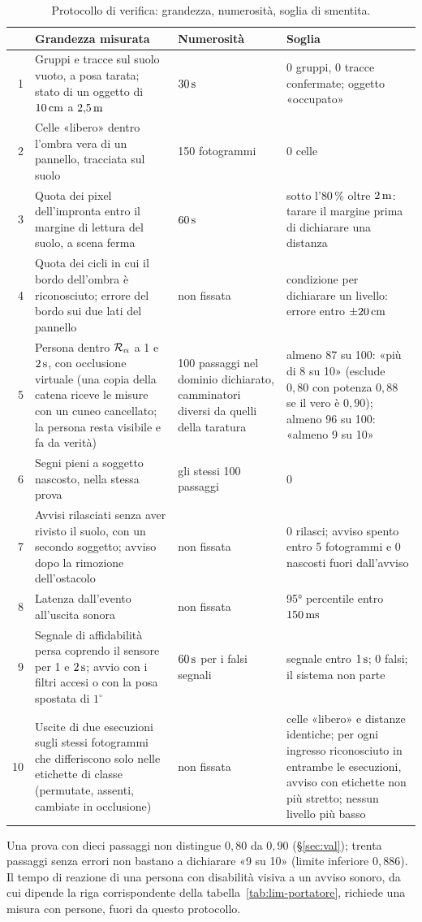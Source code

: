 \begin{table}[H]\centering\footnotesize
\caption{Protocollo di verifica: grandezza, numerosità, soglia di smentita.}\label{tab:lim-misure}
\begin{tabularx}{\linewidth}{@{}rLp{4.0cm}p{4.6cm}@{}}
\toprule
 & Grandezza misurata & Numerosità & Soglia\\
 & Gruppi e tracce sul suolo vuoto, a posa tarata; stato di un oggetto di $10\,\mathrm{cm}$ a $2{,}5\,\mathrm{m}$ & $30\,\mathrm{s}$ & 0 gruppi, 0 tracce confermate; oggetto «occupato»\\
2 & Celle «libero» dentro l'ombra vera di un pannello, tracciata sul suolo & 150 fotogrammi & 0 celle\\
3 & Quota dei pixel dell'impronta entro il margine di lettura del suolo, a scena ferma & $60\,\mathrm{s}$ & sotto l'$80\,\%$ oltre $2\,\mathrm{m}$: tarare il margine prima di dichiarare una distanza\\
4 & Quota dei cicli in cui il bordo dell'ombra è riconosciuto; errore del bordo sui due lati del pannello & non fissata & condizione per dichiarare un livello: errore entro $\pm20\,\mathrm{cm}$\\
5 & Persona dentro $\mathcal{R}_\alpha$ a 1 e $2\,\mathrm{s}$, con occlusione virtuale (una copia della catena riceve le misure con un cuneo cancellato; la persona resta visibile e fa da verità) & 100 passaggi nel dominio dichiarato, camminatori diversi da quelli della taratura & almeno 87 su 100: «più di 8 su 10» (esclude $0{,}80$ con potenza $0{,}88$ se il vero è $0{,}90$); almeno 96 su 100: «almeno 9 su 10»\\
6 & Segni pieni a soggetto nascosto, nella stessa prova & gli stessi 100 passaggi & 0\\
7 & Avvisi rilasciati senza aver rivisto il suolo, con un secondo soggetto; avviso dopo la rimozione dell'ostacolo & non fissata & 0 rilasci; avviso spento entro 5 fotogrammi e 0 nascosti fuori dall'avviso\\
8 & Latenza dall'evento all'uscita sonora & non fissata & 95° percentile entro $150\,\mathrm{ms}$\\
9 & Segnale di affidabilità persa coprendo il sensore per 1 e $2\,\mathrm{s}$; avvio con i filtri accesi o con la posa spostata di $1^\circ$ & $60\,\mathrm{s}$ per i falsi segnali & segnale entro $1\,\mathrm{s}$; 0 falsi; il sistema non parte\\
10 & Uscite di due esecuzioni sugli stessi fotogrammi che differiscono solo nelle etichette di classe (permutate, assenti, cambiate in occlusione) & non fissata & celle «libero» e distanze identiche; per ogni ingresso riconosciuto in entrambe le esecuzioni, avviso con etichette non più stretto; nessun livello più basso\\
\bottomrule
\end{tabularx}
\end{table}

Una prova con dieci passaggi non distingue $0{,}80$ da $0{,}90$ (\S\ref{sec:val}); trenta passaggi senza errori non bastano a dichiarare «9 su 10» (limite inferiore $0{,}886$). Il tempo di reazione di una persona con disabilità visiva a un avviso sonoro, da cui dipende la riga corrispondente della tabella~\ref{tab:lim-portatore}, richiede una misura con persone, fuori da questo protocollo.
